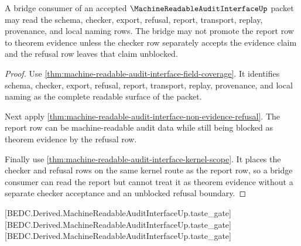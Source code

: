 \begin{theorem}
\label{thm:machine-readable-audit-interface-bridge-readiness}
A bridge consumer of an accepted $\MachineReadableAuditInterfaceUp$ packet may read the schema, checker, export, refusal, report, transport, replay, provenance, and local naming rows. The bridge may not promote the report row to theorem evidence unless the checker row separately accepts the evidence claim and the refusal row leaves that claim unblocked.
\end{theorem}
\begin{proof}
Use \autoref{thm:machine-readable-audit-interface-field-coverage}. It identifies schema, checker, export, refusal, report, transport, replay, provenance, and local naming as the complete readable surface of the packet.

Next apply \autoref{thm:machine-readable-audit-interface-non-evidence-refusal}. The report row can be machine-readable audit data while still being blocked as theorem evidence by the refusal row.

Finally use \autoref{thm:machine-readable-audit-interface-kernel-scope}. It places the checker and refusal rows on the same kernel route as the report row, so a bridge consumer can read the report but cannot treat it as theorem evidence without a separate checker acceptance and an unblocked refusal boundary.
\end{proof}

[BEDC.Derived.MachineReadableAuditInterfaceUp.taste\_gate]
[BEDC.Derived.MachineReadableAuditInterfaceUp.taste\_gate]
[BEDC.Derived.MachineReadableAuditInterfaceUp.taste\_gate]

